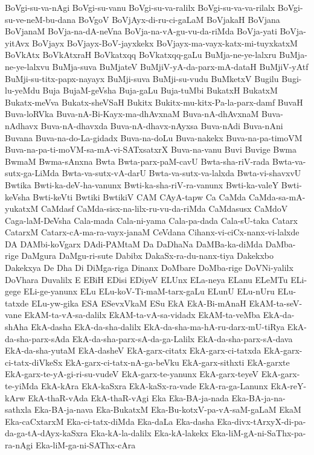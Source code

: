 {BoVgi-su-va-nAgi
BoVgi-su-vanu
BoVgi-su-va-ralilx
BoVgi-su-va-va-rilalx
BoVgi-su-ve-neM-bu-dana
BoVgoV
BoVjAyx-di-ru-ci-gaLaM
BoVjakaH
BoVjana
BoVjanaM
BoVja-na-dA-neVna
BoVja-na-vA-gu-vu-da-riMda
BoVja-yati
BoVja-yitAvx
BoVjayx
BoVjayx-BoV-jayxkekx
BoVjayx-ma-vayx-katx-mi-tuyxkatxM
BoVkAtx
BoVkAtxraH
BoVkatxqq
BoVkatxqq-gaLu
BuMja-ne-ye-lalxru
BuMja-ne-ye-lalxvu
BuMja-suva
BuMjateV
BuMjiV-yA-da-parx-mA-dataH
BuMjiV-yAtf
BuMji-su-titx-papx-nayayx
BuMji-suva
BuMji-su-vudu
BuMketxV
Bugilu
Bugi-lu-yeMdu
Buja
BujaM-geVsha
Buja-gaLu
Buja-tuMbi
BukatxH
BukatxM
Bukatx-meVva
Bukatx-sheVSaH
Bukitx
Bukitx-mu-kitx-Pa-la-parx-damf
BuvaH
Buva-loRVka
Buva-nA-Bi-Kayx-ma-dhAvxnaM
Buva-nA-dhAvxnaM
Buva-nAdhavx
Buva-nA-dhavxda
Buva-nA-dhavx-nAyxsa
Buva-nAdi
Buva-nAni
Buvana
Buva-na-do-La-gidadx
Buva-na-doLu
Buva-nakekx
Buva-na-pa-timoVM
Buva-na-pa-ti-moVM-sa-mA-vi-SATxsatxrX
Buva-na-vanu
Buvi
Buvige
Bwma
BwmaM
Bwma-sAnxna
Bwta
Bwta-parx-paM-cavU
Bwta-sha-riV-rada
Bwta-va-sutx-ga-LiMda
Bwta-va-sutx-vA-darU
Bwta-va-sutx-va-lalxda
Bwta-vi-shavxvU
Bwtika
Bwti-ka-deV-ha-vanunx
Bwti-ka-sha-riV-ra-vanunx
Bwti-ka-valeY
Bwti-keVsha
Bwti-keVti
Bwtiki
BwtikiV
CAM
CAyA-tapw
Ca
CaMda
CaMda-sa-mA-yukatxM
CaMdasf
CaMda-sisx-na-lilx-ru-vu-da-riMda
CaMdasusx
CaMdoV
Caga-laM-DeVsha
Cala-mada
Cala-ni-yama
Cala-pa-dada
Cala-sU-taka
Catarx
CatarxM
Catarx-cA-ma-ra-vayx-janaM
CeVdana
Cihanx-vi-ciCx-nanx-vi-lalxde
DA
DAMbi-koVgarx
DAdi-PAMtaM
Da
DaDhaNa
DaMBa-ka-diMda
DaMba-rige
DaMgura
DaMgu-ri-sute
Dabibx
DakaSx-ra-du-nanx-tiya
Dakekxbo
Dakekxya
De
Dha
Di
DiMga-riga
Dinanx
DoMbare
DoMba-rige
DoVNi-yalilx
DoVhara
Duvalilx
E
EBiH
EDisi
EDiyeV
ELUnx
ELa-neya
ELanu
ELeMTu
ELi-gege
ELi-ge-yanunx
ELu
ELu-koV-Ti-maM-tarx-gaLu
ELunU
ELu-nUru
ELu-tatxde
ELu-yw-gika
ESA
ESevxVkaM
ESu
EkA
EkA-Bi-mAnaH
EkAM-ta-seV-vane
EkAM-ta-vA-sa-dalilx
EkAM-ta-vA-sa-vidadx
EkAM-ta-veMba
EkA-da-shAha
EkA-dasha
EkA-da-sha-dalilx
EkA-da-sha-ma-hA-ru-darx-mU-tiRya
EkA-da-sha-parx-sAda
EkA-da-sha-parx-sA-da-ga-Lalilx
EkA-da-sha-parx-sA-dava
EkA-da-sha-yutaM
EkA-dasheV
EkA-garx-citatx
EkA-garx-ci-tatxda
EkA-garx-ci-tatx-diVkeSx
EkA-garx-ci-tatx-nA-ga-beVku
EkA-garx-sithxti
EkA-garxte
EkA-garx-te-yA-gi-ri-su-vudeV
EkA-garx-te-yanunx
EkA-garx-teyeV
EkA-garx-te-yiMda
EkA-kAra
EkA-kaSxra
EkA-kaSx-ra-vade
EkA-ra-ga-Lanunx
EkA-reY-kArw
EkA-thaR-vAda
EkA-thaR-vAgi
Eka
Eka-BA-ja-nada
Eka-BA-ja-na-sathxla
Eka-BA-ja-nava
Eka-BukatxM
Eka-Bu-kotxV-pa-vA-saM-gaLaM
EkaM
Eka-caCxtarxM
Eka-ci-tatx-diMda
Eka-daLa
Eka-dasha
Eka-divx-tArxyX-di-pa-da-ga-tA-dAyx-kaSxra
Eka-kA-la-dalilx
Eka-kA-lakekx
Eka-liM-gA-ni-SaThx-pa-ra-nAgi
Eka-liM-ga-ni-SAThx-cAra
}

